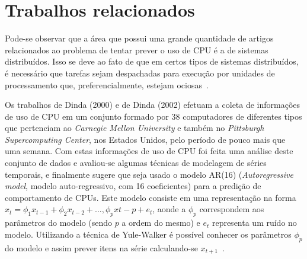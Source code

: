 %
%

\chapter{Trabalhos relacionados}

Pode-se observar que a área que possui uma grande quantidade de artigos
relacionados ao problema de tentar prever o uso de CPU é a de sistemas
distribuídos. Isso se deve ao fato de que em certos tipos de sistemas
distribuídos, é necessário que tarefas sejam despachadas para execução por
unidades de processamento que, preferencialmente, estejam ociosas~\cite{zhang2007cpu}.

Os trabalhos de Dinda (2000)\nocite{dinda2000host} e de Dinda
(2002)\nocite{dinda2002evaluation} efetuam a coleta de informações de uso de
CPU em um conjunto formado por 38 computadores de diferentes tipos que
pertenciam ao \emph{Carnegie Mellon University} e também no \emph{Pittsburgh
Supercomputing Center}, nos Estados Unidos, pelo período de pouco mais que uma
semana. Com estas informações de uso de CPU foi feita uma análise deste conjunto
de dados e avaliou-se algumas técnicas de modelagem de séries temporais, e
finalmente sugere que seja usado o modelo AR(16) (\emph{Autoregressive model},
modelo auto-regressivo, com 16 coeficientes) para a predição de comportamento
de CPUs. Este modelo consiste em uma representação na forma
$x_t = \phi_{1}x_{t-1} + \phi_{2}x_{t-2}+\dotsc,\phi_{p}x{t-p}+e_t$, aonde a
$\phi_p$ correspondem aos parâmetros do modelo (sendo $p$ a ordem do mesmo) e
$e_t$ representa um ruído no modelo. Utilizando a técnica de Yule-Walker é
possível conhecer os parâmetros $\phi_p$ do modelo e assim prever itens na
série calculando-se $x_{t+1}$~\cite{baddour2005autoregressive}.

